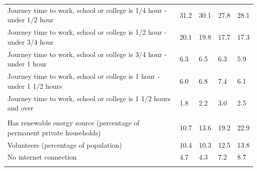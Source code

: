 \documentclass{article}
\begin{document}
\begin{table}[h]
\begin{tabular}{KTTTT}
Journey time to work, school or college is 1/4 hour - under 1/2 hour & 31.2& 30.1& 27.8& 28.1\\
Journey time to work, school or college is 1/2 hour - under 3/4 hour & 20.1& 19.8& 17.7& 17.3\\
Journey time to work, school or college is 3/4 hour - under 1 hour & 6.3& 6.5& 6.3& 5.9\\
Journey time to work, school or college is 1 hour - under 1 1/2 hours & 6.0& 6.8& 7.4& 6.1\\
Journey time to work, school or college is 1 1/2 hours and over & 1.8& 2.2& 3.0& 2.5\\
\hline
    \\ 
    \hline
Has renewable energy source (percentage of permanent private households) & 10.7& 13.6& 19.2& 22.9\\
    \hline
Volunteers (percentage of population) & 10.4& 10.3& 12.5& 13.8\\
    \hline
No internet connection& 4.7& 4.3& 7.2& 8.7\\
\hline
\end{tabular}
\end{table}
\end{document}
